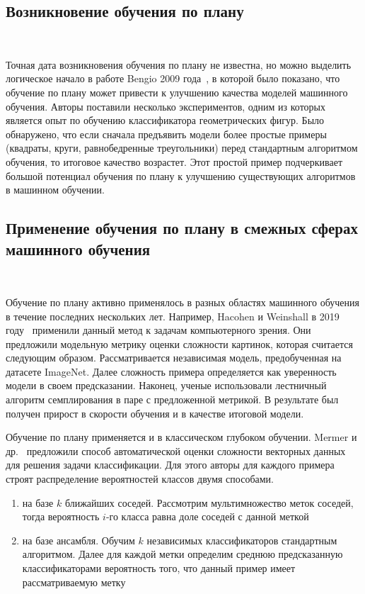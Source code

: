 \documentclass{spbau-diploma}
\begin{document}
\subsection{Возникновение обучения по плану}
\ 

Точная дата возникновения обучения по плану не известна, но можно выделить логическое начало в работе Bengio 2009 года~\cite{bengio2009curriculum}, в которой было показано, что обучение по плану может привести к улучшению качества моделей машинного обучения. Авторы поставили несколько экспериментов, одним из которых является опыт по обучению классификатора геометрических фигур. Было обнаружено, что если сначала предъявить модели более простые примеры (квадраты, круги, равнобедренные треугольники) перед стандартным алгоритмом обучения, то итоговое качество возрастет. Этот простой пример подчеркивает большой потенциал обучения по плану к улучшению существующих алгоритмов в машинном обучении.
\subsection{Применение обучения по плану в смежных сферах машинного обучения}
\ 

Обучение по плану активно применялось в разных областях машинного обучения в течение последних нескольких лет. Например, Hacohen и Weinshall в 2019 году~\cite{hacohen2019power} применили данный метод к задачам компьютерного зрения. Они предложили модельную метрику оценки сложности картинок, которая считается следующим образом. Рассматривается независимая модель, предобученная на датасете ImageNet. Далее сложность примера определяется как уверенность модели в своем предсказании. Наконец, ученые использовали лестничный алгоритм семплирования в паре с предложенной метрикой. В результате был получен прирост в скорости обучения и в качестве итоговой модели.

Обучение по плану применяется и в классическом глубоком обучении. Mermer и др.~\cite{mermer2017scalable} предложили способ автоматической оценки сложности векторных данных для решения задачи классификации. Для этого авторы для каждого примера строят распределение вероятностей классов двумя способами.
\begin{enumerate}
	\item на базе $k$ ближайших соседей. Рассмотрим мультимножество меток соседей, тогда вероятность $i$-го класса равна доле соседей с данной меткой
	\item на базе ансамбля. Обучим $k$ независимых классификаторов стандартным алгоритмом. Далее для каждой метки определим среднюю предсказанную классификаторами вероятность того, что данный пример имеет рассматриваемую метку
\end{enumerate}
	
\end{document}
